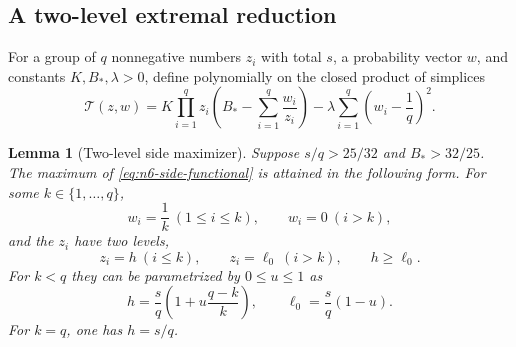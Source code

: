 \documentclass[11pt]{article}
\newtheorem{lemma}[theorem]{Lemma}
\theoremstyle{definition}
\newcommand{\1}{\mathbf{1}}
\begin{document}
\subsection{A two-level extremal reduction}

For a group of $q$ nonnegative numbers $z_i$ with total $s$, a probability
vector $w$, and constants $K,B_*,\lambda>0$, define polynomially on the
closed product of simplices
\begin{equation}\label{eq:n6-side-functional}
 \mathcal T(z,w)=
 K\prod_{i=1}^qz_i
 \left(B_*-\sum_{i=1}^q\frac{w_i}{z_i}\right)
 -\lambda\sum_{i=1}^q\left(w_i-\frac1q\right)^2.
\end{equation}

\begin{lemma}[Two-level side maximizer]\label{lem:n6-two-level}
Suppose $s/q>25/32$ and $B_*>32/25$.  The maximum of
\eqref{eq:n6-side-functional} is attained in the following form.  For some
$k\in\{1,\dots,q\}$,
\[
 w_i=\frac1k\ (1\le i\le k),
 \qquad
 w_i=0\ (i>k),
\]
and the $z_i$ have two levels,
\[
 z_i=h\ (i\le k),
 \qquad
 z_i=\ell_0\ (i>k),
 \qquad h\ge\ell_0.
\]
For $k<q$ they can be parametrized by $0\le u\le1$ as
\begin{equation}\label{eq:n6-two-level-param}
 h=\frac{s}{q}\left(1+u\frac{q-k}{k}\right),
 \qquad
 \ell_0=\frac{s}{q}(1-u).
\end{equation}
For $k=q$, one has $h=s/q$.
\end{lemma}
\end{document}
